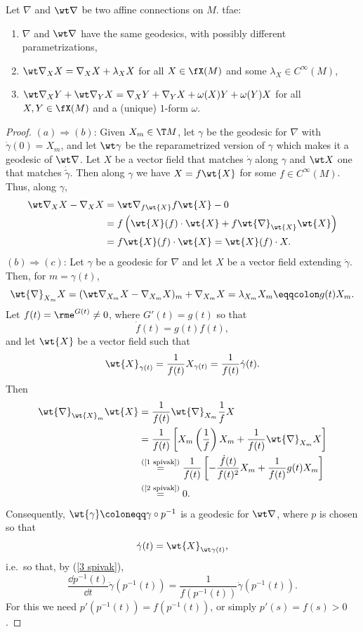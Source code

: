 \begin{prop}
    Let $\nabla$ and $\wt\nabla$ be two affine connections on $M$. \gls{tfae}:
    \begin{enumerate}[label=(\alph*)]
        \item $\nabla$ and $\wt\nabla$ have the same geodesics, with possibly different parametrizations,
        \item $\wt\nabla_X X=\nabla_X X+\lambda_X X$ for all $X\in \fX(M)$ and some $\lambda_X\in C^\infty(M)$,
        \item $\wt\nabla_X Y+\wt\nabla_Y X=\nabla_X Y+\nabla_Y X+\omega(X)Y+\omega(Y)X$ for all $X,Y\in\fX(M)$ and a (unique) $1$-form $\omega$.
    \end{enumerate}    
\end{prop}
\begin{proof}
    $(a)\Rightarrow(b)$: Given $X_m\in \T M$, let $\gamma$  be the geodesic for $\nabla$ with $\dot\gamma(0)=X_m$, and let $\wt\gamma$ be the reparametrized version of $\gamma$ which makes it a geodesic of $\wt\nabla$. Let $X$ be a vector field that matches $\dot\gamma$ along $\gamma$ and $\wt X$ one that matches $\dot{\tilde\gamma}$. Then along $\gamma$ we have $X=f\wt{X}$ for some $f\in C^\infty(M)$. Thus, along $\gamma$,
    \begin{align}
        \wt\nabla_X X-\nabla_X X&= \wt\nabla_{f\wt{X}}f\wt{X}-0\\
        &= f\left(\wt{X}(f)\cdot \wt{X}+f\wt{\nabla}_{\wt{X}}\wt{X}\right)\\
        &= f\wt{X}(f)\cdot \wt{X}=\wt{X}(f)\cdot X.
    \end{align}
    $(b)\Rightarrow(c)$: Let $\gamma$ be a geodesic for $\nabla$ and let $X$ be a vector field extending $\dot\gamma$. Then, for $m=\gamma(t)$,
    \[\wt{\nabla}_{X_m}X=(\wt\nabla_{X_m} X-\nabla_{X_m} X)_m+\nabla_{X_m}X=\lambda_{X_m}X_m\eqqcolon g(t)X_m.\label{1 spivak}\]
    Let $f(t)=\rme^{G(t)}\neq 0$, where $G'(t)=g(t)$ so that 
    \[\dot f(t)=g(t)f(t),\label{2 spivak}\] 
    and let $\wt{X}$ be a vector field such that 
    \[\wt{X}_{\gamma(t)}=\frac{1}{f(t)}X_{\gamma(t)}=\frac{1}{f(t)}\dot\gamma(t).\label{3 spivak}\]
    Then 
    \begin{align}
        \wt{\nabla}_{\wt{X}_m}\wt{X}&= \frac{1}{f(t)}\wt{\nabla}_{X_m}\frac{1}{f}X\\
        &= \frac{1}{f(t)}\left[X_m\left(\frac{1}{f}\right)X_m+\frac{1}{f(t)}\wt{\nabla}_{X_m}X\right]\\
        &\overset{\text{(\ref{1 spivak})}}{=}\frac{1}{f(t)}\left[-\frac{\dot f(t)}{f(t)^2}X_m+\frac{1}{f(t)}g(t)X_m\right]\\
        &\overset{\text{(\ref{2 spivak})}}{=} 0.
    \end{align}
    Consequently, $\wt{\gamma}\coloneqq \gamma\circ p^{-1}$ is a geodesic for $\wt\nabla$, where $p$ is chosen so that 
    \[\dot\gamma(t)=\wt{X}_{\wt\gamma(t)},\]
    i.e.\ so that, by (\ref{3 spivak}),
    \[\frac{\dd p^{-1}(t)}{\dd t}\dot\gamma(p^{-1}(t))=\frac{1}{f(p^{-1}(t))}\dot\gamma(p^{-1}(t)).\]
    For this we need $p'(p^{-1}(t))=f(p^{-1}(t))$, or simply $p'(s)=f(s)>0$.


\end{proof}
